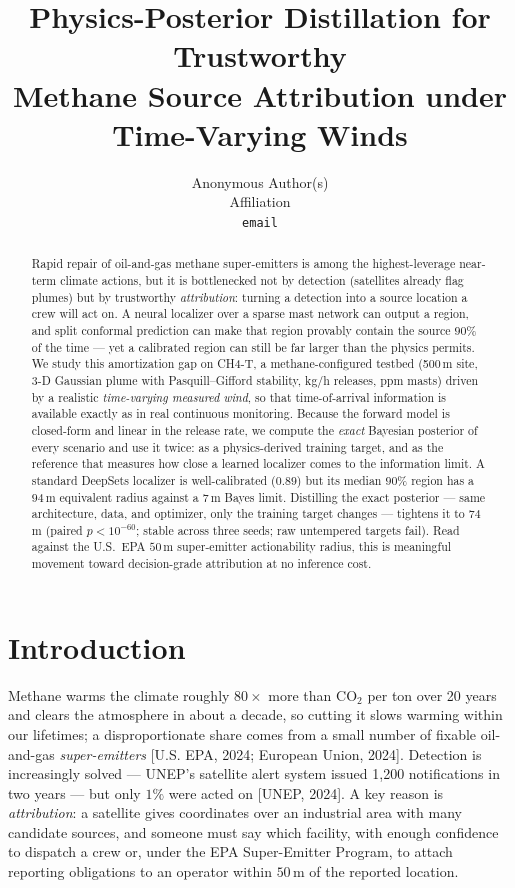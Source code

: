 \documentclass{article}
\title{Physics-Posterior Distillation for Trustworthy\\
Methane Source Attribution under Time-Varying Winds}
\author{Anonymous Author(s)\\ Affiliation\\ \texttt{email}}
\begin{document}
\maketitle

\begin{abstract}
Rapid repair of oil-and-gas methane super-emitters is among the highest-leverage
near-term climate actions, but it is bottlenecked not by detection (satellites already
flag plumes) but by trustworthy \emph{attribution}: turning a detection into a source
location a crew will act on. A neural localizer over a sparse mast network can output a
region, and split conformal prediction can make that region provably contain the source
$90\%$ of the time --- yet a calibrated region can still be far larger than the physics
permits. We study this amortization gap on CH4-T, a methane-configured testbed
(500\,m site, 3-D Gaussian plume with Pasquill--Gifford stability, kg/h releases, ppm
masts) driven by a realistic \emph{time-varying measured wind}, so that time-of-arrival
information is available exactly as in real continuous monitoring. Because the forward
model is closed-form and linear in the release rate, we compute the \emph{exact} Bayesian
posterior of every scenario and use it twice: as a physics-derived training target, and
as the reference that measures how close a learned localizer comes to the information
limit. A standard DeepSets localizer is well-calibrated ($0.89$) but its median $90\%$
region has a $94$\,m equivalent radius against a $7$\,m Bayes limit. Distilling the exact
posterior --- same architecture, data, and optimizer, only the training target changes ---
tightens it to $74$\,m (paired $p<10^{-60}$; stable across three seeds; raw untempered
targets fail). Read against the U.S.\ EPA $50$\,m super-emitter actionability radius, this
is meaningful movement toward decision-grade attribution at no inference cost.
\end{abstract}

\section{Introduction}

Methane warms the climate roughly $80\times$ more than CO$_2$ per ton over 20 years and
clears the atmosphere in about a decade, so cutting it slows warming within our lifetimes;
a disproportionate share comes from a small number of fixable oil-and-gas
\emph{super-emitters} [U.S. EPA, 2024; European Union, 2024]. Detection is increasingly
solved --- UNEP's satellite alert system issued 1{,}200 notifications in two years --- but
only $1\%$ were acted on [UNEP, 2024]. A key reason is \emph{attribution}: a satellite
gives coordinates over an industrial area with many candidate sources, and someone must
say which facility, with enough confidence to dispatch a crew or, under the EPA
Super-Emitter Program, to attach reporting obligations to an operator within $50$\,m of the
reported location.
\end{document}
